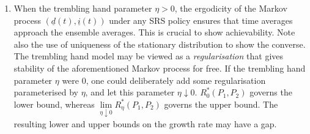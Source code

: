 \begin{enumerate}
\item When the trembling hand parameter $\eta>0$, the ergodicity of the Markov process $(\underline{d}(t), \underline{i}(t))$ under any SRS policy ensures that time averages approach the ensemble averages. This is crucial to show achievability. Note also the use of uniqueness of the stationary distribution to show the converse. The trembling hand model may be viewed as a {\em regularisation} that gives stability of the aforementioned Markov process for free. If the trembling hand parameter $\eta$ were 0, one could deliberately add some regularisation parameterised by $\eta$, and let this parameter $\eta \downarrow 0$. $R_{0}^*(P_1,P_2)$ governs the lower bound, whereas $\lim\limits_{\eta \downarrow 0}R_{\eta}^*(P_1,P_2)$ governs the upper bound. The resulting lower and upper bounds on the growth rate may have a gap.

\end{enumerate}


















